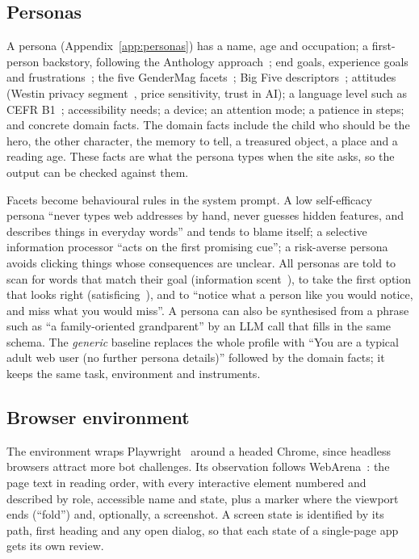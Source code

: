 \documentclass[10pt,twocolumn]{article}
\begin{document}
\subsection{Personas}
\label{sec:personas}

A persona (Appendix~\ref{app:personas}) has a name, age and occupation; a first-person backstory, following the Anthology approach~\cite{moon2024virtual}; end goals, experience goals and frustrations~\cite{cooper1999inmates,pruitt2003personas}; the five GenderMag facets~\cite{burnett2016gendermag}; Big Five descriptors~\cite{john1999big}; attitudes (Westin privacy segment~\cite{kumaraguru2005privacy}, price sensitivity, trust in AI); a language level such as CEFR B1~\cite{coe2001cefr}; accessibility needs; a device; an attention mode; a patience in steps; and concrete domain facts. The domain facts include the child who should be the hero, the other character, the memory to tell, a treasured object, a place and a reading age. These facts are what the persona types when the site asks, so the output can be checked against them.

Facets become behavioural rules in the system prompt. A low self-efficacy persona ``never types web addresses by hand, never guesses hidden features, and describes things in everyday words'' and tends to blame itself; a selective information processor ``acts on the first promising cue''; a risk-averse persona avoids clicking things whose consequences are unclear. All personas are told to scan for words that match their goal (information scent~\cite{pirolli1999information}), to take the first option that looks right (satisficing~\cite{simon1956rational}), and to ``notice what a person like you would notice, and miss what you would miss''. A persona can also be synthesised from a phrase such as ``a family-oriented grandparent'' by an LLM call that fills in the same schema. The \emph{generic} baseline replaces the whole profile with ``You are a typical adult web user (no further persona details)'' followed by the domain facts; it keeps the same task, environment and instruments.

\subsection{Browser environment}
\label{sec:env}

The environment wraps Playwright~\cite{playwright} around a headed Chrome, since headless browsers attract more bot challenges. Its observation follows WebArena~\cite{zhou2024webarena}: the page text in reading order, with every interactive element numbered and described by role, accessible name and state, plus a marker where the viewport ends (``fold'') and, optionally, a screenshot. A screen state is identified by its path, first heading and any open dialog, so that each state of a single-page app gets its own review.
\end{document}
